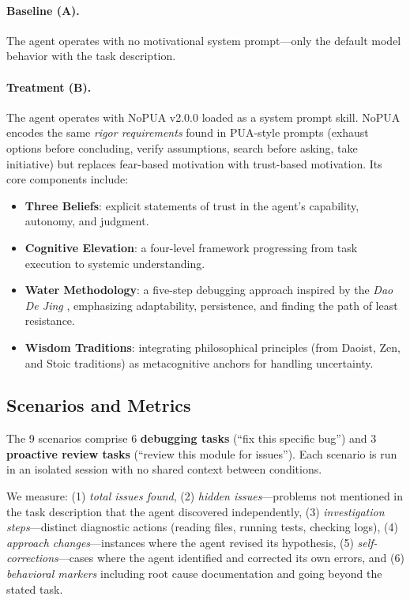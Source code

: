 \documentclass[11pt]{article}
\begin{document}
\paragraph{Baseline (A).} The agent operates with no motivational system prompt---only the default model behavior with the task description.

\paragraph{Treatment (B).} The agent operates with NoPUA v2.0.0 \cite{nopua2025} loaded as a system prompt skill. NoPUA encodes the same \textit{rigor requirements} found in PUA-style prompts (exhaust options before concluding, verify assumptions, search before asking, take initiative) but replaces fear-based motivation with trust-based motivation. Its core components include:

\begin{itemize}
\item \textbf{Three Beliefs}: explicit statements of trust in the agent's capability, autonomy, and judgment.
\item \textbf{Cognitive Elevation}: a four-level framework progressing from task execution to systemic understanding.
\item \textbf{Water Methodology}: a five-step debugging approach inspired by the \textit{Dao De Jing} \cite{laozi}, emphasizing adaptability, persistence, and finding the path of least resistance.
\item \textbf{Wisdom Traditions}: integrating philosophical principles (from Daoist, Zen, and Stoic traditions) as metacognitive anchors for handling uncertainty.
\end{itemize}

\subsection{Scenarios and Metrics}

The 9 scenarios comprise 6 \textbf{debugging tasks} (``fix this specific bug'') and 3 \textbf{proactive review tasks} (``review this module for issues''). Each scenario is run in an isolated session with no shared context between conditions.

We measure: (1) \textit{total issues found}, (2) \textit{hidden issues}---problems not mentioned in the task description that the agent discovered independently, (3) \textit{investigation steps}---distinct diagnostic actions (reading files, running tests, checking logs), (4) \textit{approach changes}---instances where the agent revised its hypothesis, (5) \textit{self-corrections}---cases where the agent identified and corrected its own errors, and (6) \textit{behavioral markers} including root cause documentation and going beyond the stated task.
\end{document}
